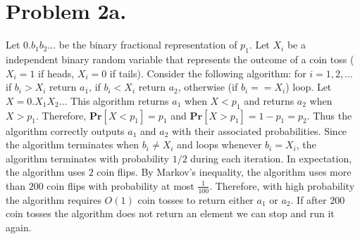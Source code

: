 \documentclass[12pt]{article}
\begin{document}
\pagestyle{plain}
\titleformat{\subsection}[runin]
  {\normalfont\large\bfseries}{\thesubsection}{1em}{}
\titleformat{\subsubsection}[runin]
  {\normalfont\large\bfseries}{\thesubsubsection}{1em}{}

\section*{Problem 2a.}
Let $0.b_1b_2...$ be the binary fractional representation of $p_1$. Let $X_i$
be a independent binary random variable that represents the outcome of a coin
toss ($X_i = 1$ if heads, $X_i = 0$ if tails). Consider the following algorithm:
for $i = 1,2,...$ if $b_i > X_i$ return $a_1$, if $b_i < X_i$ return $a_2$,
otherwise (if $b_i == X_i$) loop. Let $X = 0.X_1X_2...$ This algorithm returns
$a_1$ when $X < p_1$ and returns $a_2$ when $X > p_1$. Therefore,
$\textbf{Pr}[X < p_1] = p_1$ and $\textbf{Pr}[X > p_1] = 1 - p_1 = p_2$.
Thus the algorithm correctly outputs $a_1$ and $a_2$ with their associated
probabilities. Since the algorithm terminates when $b_i \neq X_i$ and loops
whenever $b_i = X_i$, the algorithm terminates with probability $1/2$ during
each iteration. In expectation, the algorithm uses $2$ coin flips. By Markov's
inequality, the algorithm uses more than $200$ coin flips with probability at
most  $\frac{1}{100}$. Therefore, with high probability the algorithm requires
$O(1)$ coin tosses to return either $a_1$ or $a_2$. If after $200$ coin tosses
the algorithm does not return an element we can stop and run it again.
\end{document}
